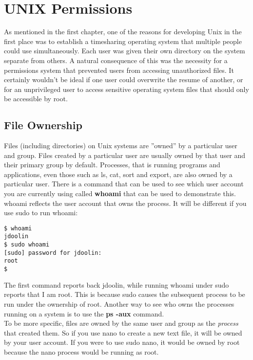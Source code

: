 \chapter{UNIX Permissions}

As mentioned in the first chapter, one of the reasons for developing Unix in the first place was to establish a timesharing operating system that multiple people could use simultaneously.  Each user was given their own directory on the system separate from others.  A natural consequence of this was the necessity for a permissions system that prevented users from accessing unauthorized files.  It certainly wouldn't be ideal if one user could overwrite the resume of another, or for an unprivileged user to access sensitive operating system files that should only be accessible by root.

\section{File Ownership}

Files (including directories) on Unix systems are ''owned'' by a particular user and group.  Files created by a particular user are usually owned by that user and their primary group by default.  Processes, that is running programs and applications, even those such as ls, cat, sort and export, are also owned by a particular user.  There is a command that can be used to see which user account you are currently using called \textbf{whoami} that can be used to demonstrate this.  whoami reflects the user account that owns the process.  It will be different if you use sudo to run whoami:

\begin{verbatim}
$ whoami
jdoolin
$ sudo whoami
[sudo] password for jdoolin:
root
$
\end{verbatim}

The first command reports back jdoolin, while running whoami under sudo reports that I am root.  This is because sudo causes the subsequent process to be run under the ownership of root.  Another way to see who owns the processes running on a system is to use the \textbf{ps -aux} command.\\

To be more specific, files are owned by the same user and group as the \textit{process} that created them.  So if you use nano to create a new text file, it will be owned by your user account.  If you were to use sudo nano, it would be owned by root because the nano process would be running as root.\\

